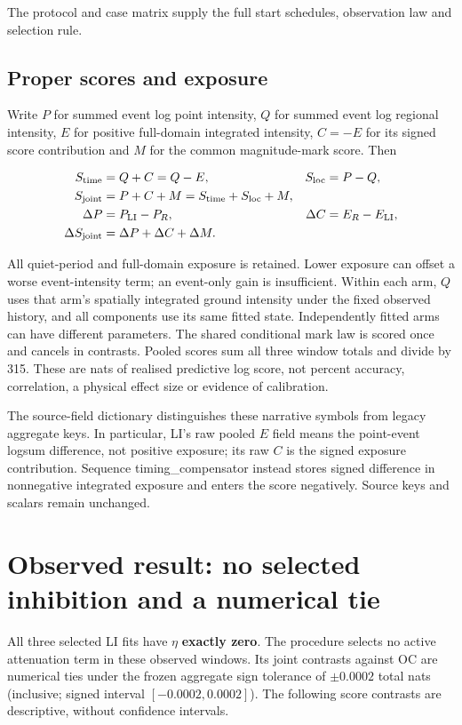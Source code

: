 The protocol and case matrix supply the full start schedules, observation law and selection rule.

\subsection{Proper scores and exposure}

Write $P$ for summed event log point intensity, $Q$ for summed event log regional intensity, $E$ for positive full-domain integrated intensity, $C=-E$ for its signed score contribution and $M$ for the common magnitude-mark score. Then

\begin{align}
S_{\rm time}&=Q+C=Q-E,&S_{\rm loc}&=P-Q,\\
S_{\rm joint}&=P+C+M=S_{\rm time}+S_{\rm loc}+M,\\
\Delta P&=P_{\rm LI}-P_R,&\Delta C&=E_R-E_{\rm LI},\\
\Delta S_{\rm joint}&=\Delta P+\Delta C+\Delta M.
\end{align}

All quiet-period and full-domain exposure is retained. Lower exposure can offset a worse event-intensity term; an event-only gain is insufficient. Within each arm, $Q$ uses that arm's spatially integrated ground intensity under the fixed observed history, and all components use its same fitted state. Independently fitted arms can have different parameters. The shared conditional mark law is scored once and cancels in contrasts. Pooled scores sum all three window totals and divide by 315. These are nats of realised predictive log score, not percent accuracy, correlation, a physical effect size or evidence of calibration.

The source-field dictionary distinguishes these narrative symbols from legacy aggregate keys. In particular, LI's raw pooled $E$ field means the point-event logsum difference, not positive exposure; its raw $C$ is the signed exposure contribution. Sequence timing\_\allowbreak{}compensator instead stores signed difference in nonnegative integrated exposure and enters the score negatively. Source keys and scalars remain unchanged.

\section{Observed result: no selected inhibition and a numerical tie}

All three selected LI fits have $\eta$ \textbf{exactly zero}. The procedure selects no active attenuation term in these observed windows. Its joint contrasts against OC are numerical ties under the frozen aggregate sign tolerance of $\pm 0.0002$ total nats (inclusive; signed interval $[-0.0002,0.0002]$). The following score contrasts are descriptive, without confidence intervals.

